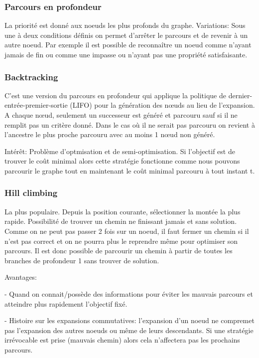 \subsubsection{Parcours en profondeur}
La priorité est donné aux noeuds les plus profonds du graphe.
Variations: Sous une à deux conditions définis on permet d'arrêter le parcours et de revenir à un autre noeud. Par exemple il est possible de reconnaître un noeud comme n'ayant jamais de fin ou comme une impasse ou n'ayant pas une propriété satisfaisante.

\subsubsection{Backtracking}
C'est une version du parcours en profondeur qui applique la politique de dernier-entrée-premier-sortie (LIFO) pour la génération des nœuds au lieu de l'expansion.
A chaque nœud, seulement un successeur est généré et parcouru sauf si il ne remplit pas un critère donné. Dans le cas où il ne serait pas parcouru on revient à l'ancestre le plus proche parcouru avec au moins 1 nœud non généré.

Intérêt: Problème d'optmisation et de semi-optimisation. Si l'objectif est de trouver le coût minimal alors cette stratégie fonctionne comme nous pouvons parcourir le graphe tout en maintenant le coût minimal parcouru à tout instant t.

\subsubsection{Hill climbing}
La plus populaire. Depuis la position courante, sélectionner la montée la plus rapide.
Possibilité de trouver un chemin ne finissant jamais et sans solution.
Comme on ne peut pas passer 2 fois sur un noeud, il faut fermer un chemin si il n'est pas correct et on ne pourra plus le reprendre même pour optimiser son parcours. Il est donc possible de parcourir un chemin à partir de toutes les branches de profondeur 1 sans trouver de solution.

Avantages: 

- Quand on connait/possède des informations pour éviter les mauvais parcours et atteindre plus rapidement l'objectif fixé.

- Histoire sur les expansions commutatives: l'expansion d'un noeud ne compremet pas l'expansion des autres noeuds ou même de leurs descendants. Si une stratégie irrévocable est prise (mauvais chemin) alors cela n'affectera pas les prochains parcours.

